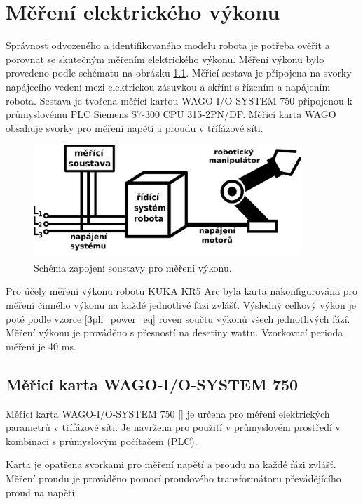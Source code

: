 \chapter{Měření elektrického výkonu}

Správnost odvozeného a identifikovaného modelu robota je potřeba ověřit a porovnat se skutečným měřením elektrického výkonu. Měření výkonu bylo provedeno podle schématu na obrázku \ref{mereni_vykonu_pic}. Měřicí sestava je připojena na svorky napájecího vedení mezi elektrickou zásuvkou a skříní s řízením a napájením robota. Sestava je tvořena měřicí kartou WAGO-I/O-SYSTEM 750 připojenou k průmyslovému PLC Siemens S7-300 CPU 315-2PN/DP. Měřicí karta WAGO obsahuje svorky pro měření napětí a proudu v třífázové síti. 

\begin{figure}[ht]
\includegraphics[width=0.9\textwidth]{mereni_vykonu_obr}
\caption{Schéma zapojení soustavy pro měření výkonu.}
\label{mereni_vykonu_pic}
\end{figure}

Pro účely měření výkonu robotu KUKA KR5 Arc byla karta nakonfigurována pro měření činného výkonu na každé jednotlivé fázi zvlášť. Výsledný celkový výkon je poté podle vzorce \ref{3ph_power_eq} roven součtu výkonů všech jednotlivých fází. Měření výkonu je prováděno s přesností na desetiny wattu. Vzorkovací perioda měření je 40 ms. 

\section{Měřicí karta WAGO-I/O-SYSTEM 750}

Měřicí karta WAGO-I/O-SYSTEM 750 [\cite{wago}] je určena pro měření elektrických parametrů v třífázové síti. Je navržena pro použití v průmyslovém prostředí v kombinaci s průmyslovým počítačem (PLC). 

Karta je opatřena svorkami pro měření napětí a proudu na každé fázi zvlášť. Měření proudu je prováděno pomocí proudového transformátoru převádějícího proud na napětí. 

